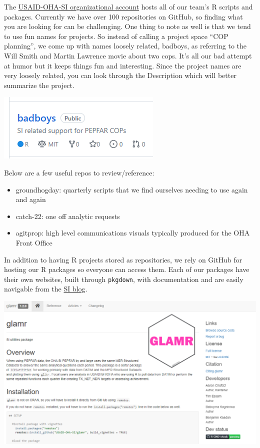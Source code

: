 \documentclass[
  letterpaper,
  DIV=11,
  numbers=noendperiod]{scrreprt}
\providecommand{\tightlist}{%
  \setlength{\itemsep}{0pt}\setlength{\parskip}{0pt}}\usepackage{longtable,booktabs,array}
\begin{document}
The \href{https://github.com/USAID-OHA-SI}{USAID-OHA-SI organizational
account} hosts all of our team's R scripts and packages. Currently we
have over 100 repositories on GitHub, so finding what you are looking
for can be challenging. One thing to note as well is that we tend to use
fun names for projects. So instead of calling a project space ``COP
planning'', we come up with names loosely related, badboys, as referring
to the Will Smith and Martin Lawrence movie about two cops. It's all our
bad attempt at humor but it keeps things fun and interesting. Since the
project names are very loosely related, you can look through the
Description which will better summarize the project.

\includegraphics{./images/image18 - badboys.png}

Below are a few useful repos to review/reference:

\begin{itemize}
\tightlist
\item
  groundhogday: quarterly scripts that we find ourselves needing to use
  again and again
\item
  catch-22: one off analytic requests
\item
  agitprop: high level communications visuals typically produced for the
  OHA Front Office
\end{itemize}

In addition to having R projects stored as repositories, we rely on
GitHub for hosting our R packages so everyone can access them. Each of
our packages have their own websites, built through \texttt{pkgdown},
with documentation and are easily navigable from the
\href{https://usaid-oha-si.github.io/tools/}{SI blog}.

\includegraphics{./images/image11 - glamr.png}
\end{document}
